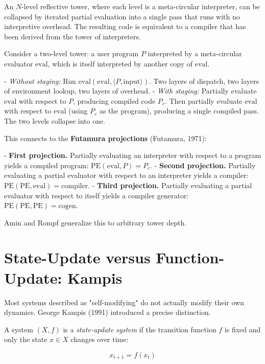 \begin{theorem}
An $N$-level reflective tower, where each level is a meta-circular interpreter, can be collapsed by iterated partial evaluation into a single pass that runs with no interpretive overhead. The resulting code is equivalent to a compiler that has been derived from the tower of interpreters.
\end{theorem}

\begin{example}
Consider a two-level tower: a user program $P$ interpreted by a meta-circular evaluator $\text{eval}$, which is itself interpreted by another copy of $\text{eval}$.

- \textit{Without staging:} Run $\text{eval}(\text{eval}, \langle P, \text{input}\rangle)$. Two layers of dispatch, two layers of environment lookup, two layers of overhead.
- \textit{With staging:} Partially evaluate $\text{eval}$ with respect to $P$, producing compiled code $P_c$. Then partially evaluate $\text{eval}$ with respect to $\text{eval}$ (using $P_c$ as the program), producing a single compiled pass. The two levels collapse into one.

This connects to the \textbf{Futamura projections} (Futamura, 1971):

- \textbf{First projection.} Partially evaluating an interpreter with respect to a program yields a compiled program: $\text{PE}(\text{eval}, P) = P_c$.
- \textbf{Second projection.} Partially evaluating a partial evaluator with respect to an interpreter yields a compiler: $\text{PE}(\text{PE}, \text{eval}) = \text{compiler}$.
- \textbf{Third projection.} Partially evaluating a partial evaluator with respect to itself yields a compiler generator: $\text{PE}(\text{PE}, \text{PE}) = \text{cogen}$.

Amin and Rompf generalize this to arbitrary tower depth.
\end{example}

\section{State-Update versus Function-Update: Kampis}

Most systems described as "self-modifying" do not actually modify their own dynamics. George Kampis (1991) introduced a precise distinction.

\begin{definition}
A system $(X, f)$ is a \textit{state-update system} if the transition function $f$ is fixed and only the state $x \in X$ changes over time:

\[x_{t+1} = f(x_t)\]
\end{definition}

